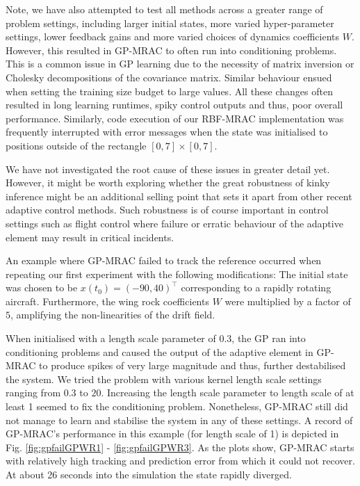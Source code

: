 Note, we have also attempted to test all methods across a greater range of problem settings, including larger initial states, more varied hyper-parameter settings, lower feedback gains and more varied choices of dynamics coefficients $W$. However, this resulted in GP-MRAC to often run into conditioning problems. This is a common issue in GP learning due to the necessity of matrix inversion or Cholesky decompositions of the covariance matrix. Similar behaviour ensued when setting the training size budget to large values. All these changes often resulted in long learning runtimes, spiky control outputs and thus, poor overall performance. Similarly, code execution of our RBF-MRAC implementation was frequently interrupted with error messages when the state was initialised to positions outside of the rectangle $[0,7] \times [0,7]$.

We have not investigated the root cause of these issues in greater detail yet. However, it might be worth exploring whether the great robustness of kinky inference might be an additional selling point that sets it apart from other recent adaptive control methods. Such robustness is of course important in control settings such as flight control where failure or erratic behaviour of the adaptive element may result in critical incidents. 

An example where GP-MRAC failed to track the reference occurred when repeating our first experiment  with the following modifications: The initial state was chosen to be $x(t_0) = (-90,40)^\top$ corresponding to a rapidly rotating aircraft. Furthermore, the wing rock coefficients $W$ were multiplied by a factor of $5$, amplifying the non-linearities of the drift field. 

When initialised with a length scale parameter of 0.3, the GP ran into conditioning problems and caused the output of the adaptive element in GP-MRAC to produce spikes of very large magnitude and thus, further destabilised the system. We tried the problem with various kernel length scale settings ranging from $0.3$ to $20$. Increasing the length scale parameter to length scale of at least 1 seemed to fix the conditioning problem. Nonetheless, GP-MRAC still did not manage to learn and stabilise the system in any of these settings. A record of GP-MRAC's performance in this example (for length scale of 1) is depicted in Fig.  \ref{fig:gpfailGPWR1} -  \ref{fig:gpfailGPWR3}. As the plots show, GP-MRAC starts with relatively high tracking and prediction error from which it could not recover. At about 26 seconds into the simulation the state rapidly diverged.

